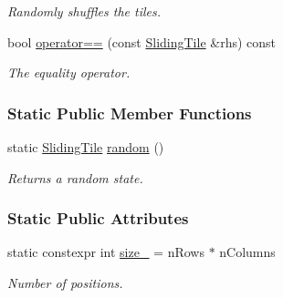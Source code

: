 \begin{DoxyCompactItemize}
\begin{DoxyCompactList}\small\item\em Randomly shuffles the tiles. \end{DoxyCompactList}\item 
bool \hyperlink{structslb_1_1ext_1_1domain_1_1sliding__tile_1_1SlidingTile_a4b292e0e315b5fcba0d5b3575fef9d76}{operator==} (const \hyperlink{structslb_1_1ext_1_1domain_1_1sliding__tile_1_1SlidingTile}{Sliding\+Tile} \&rhs) const 
\begin{DoxyCompactList}\small\item\em The equality operator. \end{DoxyCompactList}\end{DoxyCompactItemize}
\subsubsection*{Static Public Member Functions}
\begin{DoxyCompactItemize}
\item 
static \hyperlink{structslb_1_1ext_1_1domain_1_1sliding__tile_1_1SlidingTile}{Sliding\+Tile} \hyperlink{structslb_1_1ext_1_1domain_1_1sliding__tile_1_1SlidingTile_a2116de092de3922770567c9c4b00da90}{random} ()
\begin{DoxyCompactList}\small\item\em Returns a random state. \end{DoxyCompactList}\end{DoxyCompactItemize}
\subsubsection*{Static Public Attributes}
\begin{DoxyCompactItemize}
\item 
static constexpr int \hyperlink{structslb_1_1ext_1_1domain_1_1sliding__tile_1_1SlidingTile_a9a400ee0feba20908873e59620cff314}{size\+\_\+} = n\+Rows $\ast$ n\+Columns\hypertarget{structslb_1_1ext_1_1domain_1_1sliding__tile_1_1SlidingTile_a9a400ee0feba20908873e59620cff314}{}\label{structslb_1_1ext_1_1domain_1_1sliding__tile_1_1SlidingTile_a9a400ee0feba20908873e59620cff314}

\begin{DoxyCompactList}\small\item\em Number of positions. \end{DoxyCompactList}\end{DoxyCompactItemize}
